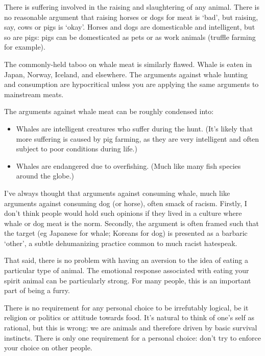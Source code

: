 There is suffering involved in the raising and slaughtering of any animal. There is no reasonable argument that raising horses or dogs for meat is `bad', but raising, say, cows or pigs is `okay'. Horses and dogs are domesticable and intelligent, but so are pigs: pigs can be domesticated as pets or as work animals (truffle farming for example).

The commonly-held taboo on whale meat is similarly flawed. Whale is eaten in Japan, Norway, Iceland, and elsewhere. The arguments against whale hunting and consumption are hypocritical unless you are applying the same arguments to mainstream meats.

The arguments against whale meat can be roughly condensed into:

\begin{itemize}
  \item Whales are intelligent creatures who suffer during the hunt. (It's likely that more suffering is caused by pig farming, as they are very intelligent and often subject to poor conditions during life.)
  \item Whales are endangered due to overfishing. (Much like many fish species around the globe.)
\end{itemize}

I've always thought that arguments against consuming whale, much like arguments against consuming dog (or horse), often smack of racism. Firstly, I don't think people would hold such opinions if they lived in a culture where whale or dog meat is the norm. Secondly, the argument is often framed such that the target (eg Japanese for whale; Koreans for dog) is presented as a barbaric `other', a subtle dehumanizing practice common to much racist hatespeak.

That said, there is no problem with having an aversion to the idea of eating a particular type of animal. The emotional response associated with eating your spirit animal can be particularly strong. For many people, this is an important part of being a furry.

There is no requirement for any personal choice to be irrefutably logical, be it religion or politics or attitude towards food. It's natural to think of one's self as rational, but this is wrong: we are animals and therefore driven by basic survival instincts. There is only one requirement for a personal choice: don't try to enforce your choice on other people.
